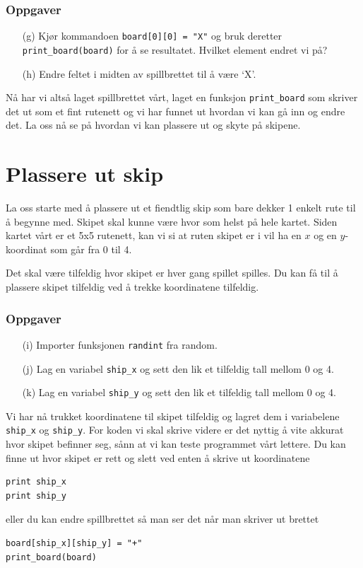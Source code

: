 \documentclass[a4paper, 11pt, notitlepage]{article}
\begin{document}
\subsubsection*{Oppgaver}
\begin{itemize}
	\item[(g)] Kjør kommandoen \verb+board[0][0] = "X"+ og bruk deretter \verb+print_board(board)+ for å se resultatet. Hvilket element endret vi på?
	\item[(h)] Endre feltet i midten av spillbrettet til å være `X'.
\end{itemize}

Nå har vi altså laget spillbrettet vårt, laget en funksjon \verb+print_board+ som skriver det ut som et fint rutenett og vi har funnet ut hvordan vi kan gå inn og endre det. La oss nå se på hvordan vi kan plassere ut og skyte på skipene.

\clearpage

\section*{Plassere ut skip}

La oss starte med å plassere ut et fiendtlig skip som bare dekker 1 enkelt rute til å begynne med. Skipet skal kunne være hvor som helst på hele kartet. Siden kartet vårt er et 5x5 rutenett, kan vi si at ruten skipet er i vil ha en $x$ og en $y$-koordinat som går fra 0 til 4. 

Det skal være tilfeldig hvor skipet er hver gang spillet spilles. Du kan få til å plassere skipet tilfeldig ved å trekke koordinatene tilfeldig.

\subsubsection*{Oppgaver}
\begin{itemize}
	\item[(i)] Importer funksjonen \verb+randint+ fra random. 
	\item[(j)] Lag en variabel \verb+ship_x+ og sett den lik et tilfeldig tall mellom 0 og 4.
	\item[(k)] Lag en variabel \verb+ship_y+ og sett den lik et tilfeldig tall mellom 0 og 4.
\end{itemize}

Vi har nå trukket koordinatene til skipet tilfeldig og lagret dem i variabelene \verb+ship_x+ og \verb+ship_y+. For koden vi skal skrive videre er det nyttig å vite akkurat hvor skipet befinner seg, sånn at vi kan teste programmet vårt lettere. Du kan finne ut hvor skipet er rett og slett ved enten å skrive ut koordinatene
\begin{lstlisting}
print ship_x
print ship_y
\end{lstlisting}
eller du kan endre spillbrettet så man ser det når man skriver ut brettet
\begin{lstlisting}
board[ship_x][ship_y] = "+"
print_board(board)
\end{lstlisting}
\end{document}
